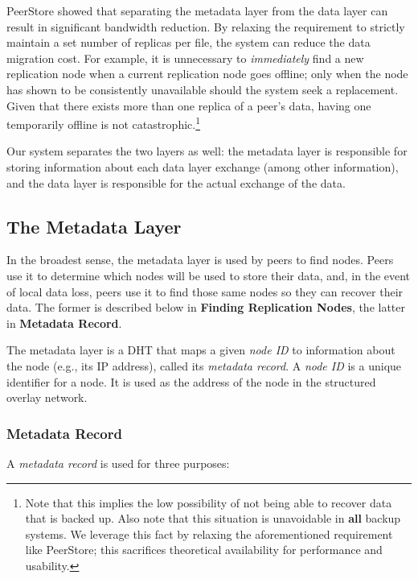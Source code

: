 \documentclass[12pt]{report}
\begin{document}
PeerStore showed that separating the metadata layer from the data layer can result in significant bandwidth reduction. By relaxing the requirement to strictly maintain a set number of replicas per file, the system can reduce the data migration cost. For example, it is unnecessary to \textit{immediately} find a new replication node when a current replication node goes offline; only when the node has shown to be consistently unavailable should the system seek a replacement. Given that there exists more than one replica of a peer's data, having one temporarily offline is not catastrophic.\footnote{Note that this implies the low possibility of not being able to recover data that is backed up. Also note that this situation is unavoidable in \textbf{all} backup systems. We leverage this fact by relaxing the aforementioned requirement like PeerStore; this sacrifices theoretical availability for performance and usability.}

Our system separates the two layers as well: the metadata layer is responsible for storing information about each data layer exchange (among other information), and the data layer is responsible for the actual exchange of the data.

\subsection{The Metadata Layer} \label{sec:TheMetadataLayer_DataExchange}

In the broadest sense, the metadata layer is used by peers to find nodes. Peers use it to determine which nodes will be used to store their data, and, in the event of local data loss, peers use it to find those same nodes so they can recover their data. The former is described below in \textbf{Finding Replication Nodes}, the latter in \textbf{Metadata Record}.

The metadata layer is a DHT that maps a given \textit{node ID} to information about the node (e.g., its IP address), called its \textit{metadata record}. A \textit{node ID} is a unique identifier for a node. It is used as the address of the node in the structured overlay network.

\subsubsection{Metadata Record} \label{subsubsec:MetadataRecord}

A \textit{metadata record} is used for three purposes:
\end{document}
